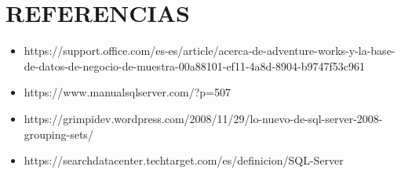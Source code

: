 \section{REFERENCIAS} 
\begin{itemize}
\item https://support.office.com/es-es/article/acerca-de-adventure-works-y-la-base-de-datos-de-negocio-de-muestra-00a88101-ef11-4a8d-8904-b9747f53c961
\item https://www.manualsqlserver.com/?p=507
\item https://grimpidev.wordpress.com/2008/11/29/lo-nuevo-de-sql-server-2008-grouping-sets/
\item https://searchdatacenter.techtarget.com/es/definicion/SQL-Server
\end{itemize}